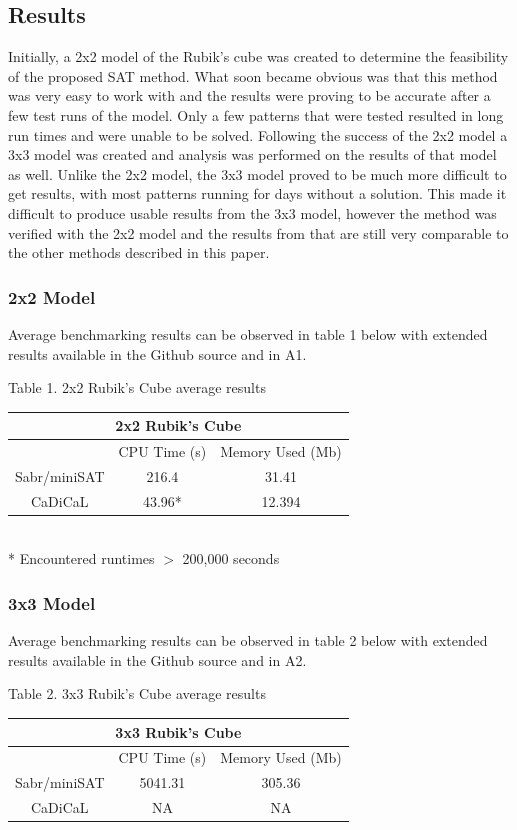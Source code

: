 \documentclass{article}
\begin{document}
\subsection{Results}
Initially, a 2x2 model of the Rubik’s cube was created to determine the feasibility of the proposed SAT method. What soon became obvious was that this method was very easy to work with and the results were proving to be accurate after a few test runs of the model. Only a few patterns that were tested resulted in long run times and were unable to be solved. Following the success of the 2x2 model a 3x3 model was created and analysis was performed on the results of that model as well. Unlike the 2x2 model, the 3x3 model proved to be much more difficult to get results, with most patterns running for days without a solution. This made it difficult to produce usable results from the 3x3 model, however the method was verified with the 2x2 model and the results from that are still very comparable to the other methods described in this paper.
\subsubsection{2x2 Model}
Average benchmarking results can be observed in table 1 below with extended results available in the Github source and in A1. \\
\begin{center}
Table 1. 2x2 Rubik's Cube average results \\
\begin{tabular}{|c|c|c|}
\hline
\multicolumn{3}{|c|}{2x2 Rubik's Cube} \\
\hline
& CPU Time (s) & Memory Used (Mb) \\
\hline
Sabr/miniSAT & 216.4 & 31.41 \\
\hline
CaDiCaL & 43.96* & 12.394 \\
\hline
\end{tabular} \\[0.1mm]
* Encountered runtimes $>$ 200,000 seconds
\end{center}

\subsubsection{3x3 Model}
Average benchmarking results can be observed in table 2 below with extended results available in the Github source and in A2. \\
\begin{center}
Table 2. 3x3 Rubik's Cube average results \\
\begin{tabular}{|c|c|c|}
\hline
\multicolumn{3}{|c|}{3x3 Rubik's Cube} \\
\hline
& CPU Time (s) & Memory Used (Mb) \\
\hline
Sabr/miniSAT & 5041.31 & 305.36 \\
\hline
CaDiCaL & NA & NA \\
\hline
\end{tabular}
\end{center}
\end{document}

